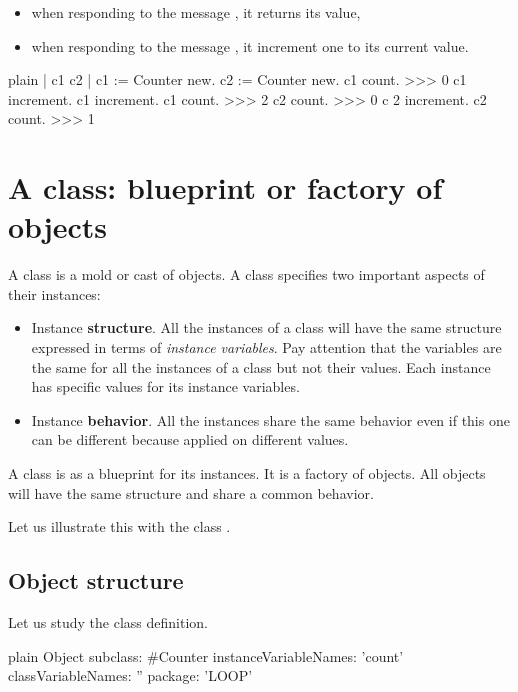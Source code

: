 \documentclass[10pt,twoside,english]{_support/latex/sbabook/sbabook}
\begin{document}
\begin{itemize}
\item when responding to the message , it returns its value,
\item when responding to the message , it increment one to its current value. 
\end{itemize}

\begin{displaycode}{plain}
| c1 c2 |
c1 := Counter new.
c2 := Counter new.
c1 count.
>>> 0
c1 increment.
c1 increment.
c1 count. 
>>> 2
c2 count.
>>> 0
c 2 increment.
c2 count. 
>>> 1
\end{displaycode}
\section{A class: blueprint or factory of objects}
A class is a mold or cast of objects. A class specifies two important aspects of their instances:

\begin{itemize}
\item Instance \textbf{structure}. All the instances of a class will have the same structure expressed in terms of \textit{instance variables}. Pay attention that the variables are the same for all the instances of a class but not their values. Each instance has specific values for its instance variables.
\item Instance \textbf{behavior}. All the instances share the same behavior even if this one can be different because applied on different values. 
\end{itemize}

\begin{important}
A class is as a blueprint for its instances. It is a factory of objects. All objects will have the same structure and share a common behavior. 
\end{important}

Let us illustrate this with the class .
\subsection{Object structure}
Let us study the  class definition.  

\begin{displaycode}{plain}
Object subclass: #Counter
	instanceVariableNames: 'count'
	classVariableNames: ''
	package: 'LOOP'
\end{displaycode}
\end{document}
